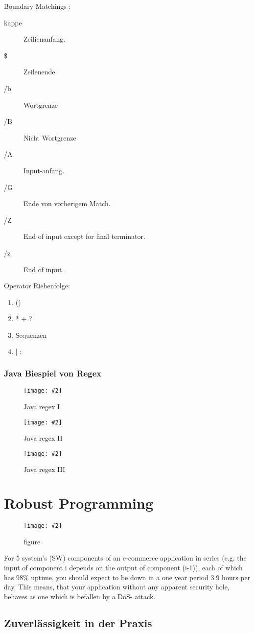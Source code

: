 \documentclass[a4paper,10pt]{scrreprt}
\newcommand{\pic}[2][figure]{\begin{figure}[h]
 \centering
 \texttt{[image: \#2]}
 \caption{#1}
\end{figure}
}
\begin{document}
Boundary Matchings :
\begin{description}
 \item [kappe] Zeilienanfang.
 \item [\$] Zeilenende.
 \item [\slash b] Wortgrenze
 \item [\slash B] Nicht Wortgrenze
 \item [\slash A] Input-anfang.
 \item [\slash G] Ende von vorherigem Match.
 \item [\slash Z] End of input except for final terminator.
 \item [\slash z] End of input.
\end{description}

Operator Riehenfolge:
\begin{enumerate}
 \item ()
 \item *  + ? {}
 \item Sequenzen
 \item | :
\end{enumerate}

\subsection{Java Biespiel von Regex}
\pic[Java regex I]{jreg1.png}
\pic[Java regex II]{java_regex2.png}
\pic[Java regex III]{java_regex3.png}



\chapter{Robust Programming}
\pic{cardinals.png}

For 5 system’s (SW) components of an e-commerce application in series
(e.g. the input of component i depends on the output of component (i-1)),
each of which has 98\% uptime, you should expect to be down in a one
year period 3.9 hours per day. This means, that your application without
any apparent security hole, behaves as one which is befallen by a DoS-
attack.

\section{Zuverlässigkeit in der Praxis}
\end{document}

